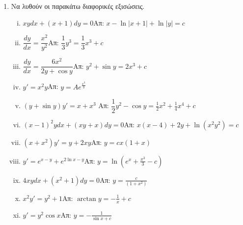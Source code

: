 


\pagestyle{askhseis}
\everymath{\displaystyle}




\begin{center}
  \minibox{\bfseries\large \textcolor{Col1}{Ασκήσεις στις Διαφορικές Εξισώσεις}}
\end{center}

\vspace{\baselineskip}

\begin{enumerate}
\item Να λυθούν οι παρακάτω διαφορικές εξισώσεις.
\begin{enumerate}[i.]
\item $xydx + (x+1)dy=0$\hfill Απ: $x-\ln|x+1|+\ln|y|=c$
\item $\dfrac{dy}{dx}=\dfrac{x^2}{y^2}$\hfill Απ: $\dfrac{1}{3}y^3=\dfrac{1}{3}x^3+c$
\item $\dfrac{dy}{dx}=\dfrac{6x^2}{2y+\cos y}$\hfill Απ: $y^2+\sin y = 2x^3 +c$
\item $y'=x^2y$\hfill Απ: $y=Ae^{\frac{x^3}{3}}$
\item $(y+\sin y)y'=x+x^3$
  \hfill Απ: $\dfrac{1}{2}y^2-\cos y = \frac{1}{2}x^2+\frac{1}{4}x^4+c$
\item $(x-1)^2ydx+(xy+x)dy=0$\hfill Απ: $x(x-4)+2y+\ln(x^2y^2)=c$
\item $(x+x^2)y'=y+2xy$\hfill Απ: $y=cx(1+x)$
\item $y'=e^{x-y}+e^{2\ln x-y}$\hfill Απ: $y=\ln(e^x+\frac{x^3}{3}-c)$
\item $4xydx+(x^2+1)dy=0$\hfill Απ: $y=\frac{c}{(1+x^2)}$
\item $x^2y'=y^2+1$\hfill Απ: $\arctan y = -\frac{1}{x}+c$
\item $y'=y^2\cos x$\hfill Απ: $y=-\frac{1}{\sin x +c }$
\end{enumerate}
\end{enumerate}




